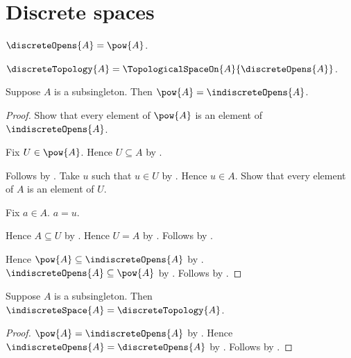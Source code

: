\section{Discrete spaces}





\begin{definition}\label{discrete_opens}
    $\discreteOpens{A}=\pow{A}$.
\end{definition}

\begin{definition}\label{discrete_topology}
    $\discreteTopology{A}=\TopologicalSpaceOn{A}{\discreteOpens{A}}$.
\end{definition}

\begin{proposition}\label{subsingleton_powerset_is_indiscrete_opens}
    Suppose $A$ is a subsingleton.
    Then $\pow{A}=\indiscreteOpens{A}$.
\end{proposition}
\begin{proof}
    Show that every element of $\pow{A}$ is an element of
        $\indiscreteOpens{A}$.
    \begin{subproof}
        Fix $U\in\pow{A}$.
        Hence $U\subseteq A$ by .
        \begin{byCase}
            Follows by .
            Take $u$ such that $u\in U$ by .
            Hence $u\in A$.
            Show that every element of $A$ is an element of $U$.
            \begin{subproof}
                Fix $a\in A$.
                $a=u$.
            \end{subproof}
            Hence $A\subseteq U$ by .
            Hence $U=A$ by .
            Follows by
                .
        \end{byCase}
    \end{subproof}
    Hence $\pow{A}\subseteq\indiscreteOpens{A}$ by .
    $\indiscreteOpens{A}\subseteq\pow{A}$ by
        .
    Follows by .
\end{proof}

\begin{theorem}\label{subsingleton_indiscrete_space_is_discrete_topology}
    Suppose $A$ is a subsingleton.
    Then $\indiscreteSpace{A}=\discreteTopology{A}$.
\end{theorem}
\begin{proof}
    $\pow{A}=\indiscreteOpens{A}$ by
        .
    Hence $\indiscreteOpens{A}=\discreteOpens{A}$ by
        .
    Follows by .
\end{proof}


